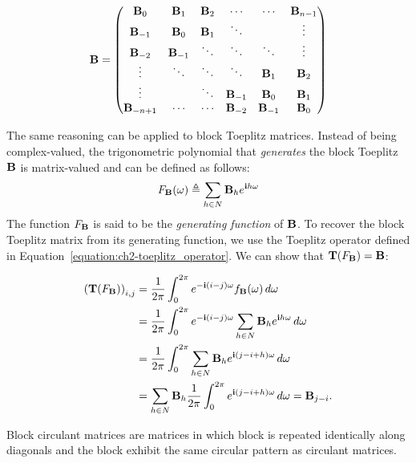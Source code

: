 \begin{equation}
  \mathbf{B} =
  \begin{pmatrix}
    \mathbf{B}_0 & \mathbf{B}_{1}   & \mathbf{B}_{2} & \cdots & \cdots & \mathbf{B}_{n-1}  \\
    \mathbf{B}_{-1} & \mathbf{B}_0 & \mathbf{B}_{1} & \ddots & & \vdots \\
    \mathbf{B}_{-2} & \mathbf{B}_{-1} & \ddots & \ddots & \ddots & \vdots \\ 
   \vdots & \ddots & \ddots & \ddots & \mathbf{B}_{1} & \mathbf{B}_{2}\\
   \vdots & & \ddots & \mathbf{B}_{-1} & \mathbf{B}_{0} & \mathbf{B}_{1} \\
  \mathbf{B}_{-n+1} & \cdots & \cdots & \mathbf{B}_{-2} & \mathbf{B}_{-1} & \mathbf{B}_0
  \end{pmatrix}
\end{equation}

\noindent
The same reasoning can be applied to block Toeplitz matrices.
Instead of being complex-valued, the trigonometric polynomial that \emph{generates} the block Toeplitz $\mathbf{B}$ is matrix-valued and can be defined as follows:
\begin{equation}
  F_{\mathbf{B}}(\omega) \triangleq \sum_{h \in N} \mathbf{B}_h e^{\mathbf{i} h \omega}
\end{equation}
The function $F_{\mathbf{B}}$ is said to be the \emph{generating function} of $\mathbf{B}$.
To recover the block Toeplitz matrix from its generating function, we use the Toeplitz operator defined in Equation~\ref{equation:ch2-toeplitz_operator}.
We can show that $\mathbf{T}(F_\mathbf{B}) = \mathbf{B}$:

\begin{align}
  \leftmat \Tmat(F_\Bmat) \rightmat_{i, j} 
  &= \frac{1}{2\pi} \int_0^{2\pi} e^{-\ci (i-j)\omega} f_{\Bmat}(\omega) \,d\omega  \\
  &= \frac{1}{2\pi} \int_0^{2\pi} e^{-\ci (i-j) \omega} \sum_{h \in N} \Bmat_h e^{\ci h \omega} \,d\omega  \\
  &= \frac{1}{2\pi} \int_0^{2\pi} \sum_{h \in N} \Bmat_h e^{\ci (j - i + h) \omega} \,d\omega  \\
  &= \sum_{h \in N} \Bmat_h \frac{1}{2\pi} \int_0^{2\pi} e^{\ci (j - i + h) \omega} \,d\omega 
  = \Bmat_{j-i} .
\end{align}


\drawline

Block circulant matrices are matrices in which block is repeated identically along diagonals and the block exhibit the same circular pattern as circulant matrices. 






